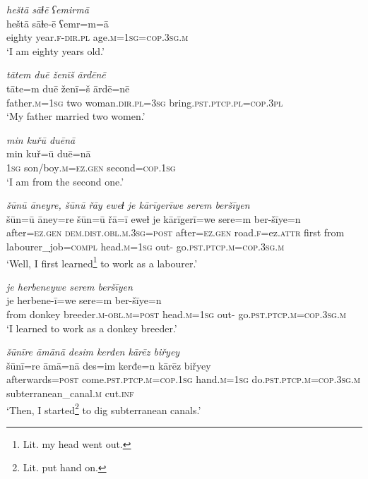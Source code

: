 \ea \label{ŽM.1}
\textit{heštā sāɫē ʕemirmā} \\ 
\gll heštā sāɫe-ē ʕemr=m=ā \\ 
 eighty year\textsc{.f}\textsc{-dir}\textsc{.pl} age\textsc{.m}\textsc{=\textsc{1sg}}\textsc{=cop}\textsc{.3sg}\textsc{.m} \\ 
\glt `I am eighty years old.'
\z 
 
\ea \label{ŽM.2}
\textit{tātem duē ženīš ārdēnē} \\ 
\gll tāte=m duē ženī=š ārdē=nē \\ 
 father\textsc{.m}\textsc{=\textsc{1sg}} two woman\textsc{.dir}\textsc{.pl}\textsc{=3sg} bring\textsc{.pst}\textsc{.ptcp}\textsc{.pl}\textsc{=cop}\textsc{.3pl} \\ 
\glt `My father married two women.'
\z 
 
\ea \label{ŽM.3}
\textit{min kuřū duēnā} \\ 
\gll min kuř=ū duē=nā \\ 
 \textsc{1sg} son/boy\textsc{.m}\textsc{=ez.gen} second\textsc{=cop}\textsc{.\textsc{1sg}} \\ 
\glt `I am from the second one.'
\z 
 
\ea \label{ŽM.4}
\textit{šūnū āneyre, šūnū řāy eweɫ je kārīgerīwe serem beršīyen} \\ 
\gll šūn=ū āney=re šūn=ū řā=ī eweɫ je kārīgerī=we sere=m ber-šīye=n \\ 
 after\textsc{=ez.gen} \textsc{dem.dist}\textsc{.obl}\textsc{.m}\textsc{.3sg}\textsc{=\textsc{post}} after\textsc{=ez.gen} road\textsc{.f}=ez.\textsc{attr} first from labourer\_job\textsc{=compl} head\textsc{.m}\textsc{=\textsc{1sg}} out- go\textsc{.pst}\textsc{.ptcp}\textsc{.m}\textsc{=cop}\textsc{.3sg}\textsc{.m} \\ 
\glt `Well, I first learned\footnote{Lit. my head went out.}  to work as a labourer.'
\z 
 
\ea \label{ŽM.5}
\textit{je herbeneywe serem beršīyen} \\ 
\gll je herbene-ī=we sere=m ber-šīye=n \\ 
 from donkey breeder\textsc{.m}\textsc{-obl}\textsc{.m}\textsc{=\textsc{post}} head\textsc{.m}\textsc{=\textsc{1sg}} out- go\textsc{.pst}\textsc{.ptcp}\textsc{.m}\textsc{=cop}\textsc{.3sg}\textsc{.m} \\ 
\glt `I learned to work as a donkey breeder.'
\z 
 
\ea \label{ŽM.6}
\textit{šūnīre āmānā desim kerđen kārēz biřyey} \\ 
\gll šūnī=re āmā=nā des=im kerđe=n kārēz biřyey \\ 
 afterwards\textsc{=\textsc{post}} come\textsc{.pst}\textsc{.ptcp}\textsc{.m}\textsc{=cop}\textsc{.\textsc{1sg}} hand\textsc{.m}\textsc{=\textsc{1sg}} do\textsc{.pst}\textsc{.ptcp}\textsc{.m}\textsc{=cop}\textsc{.3sg}\textsc{.m} subterranean\_canal\textsc{.m} cut\textsc{.inf} \\ 
\glt `Then, I started\footnote{Lit. put hand on.} to dig subterranean canals.'
\z 
 
